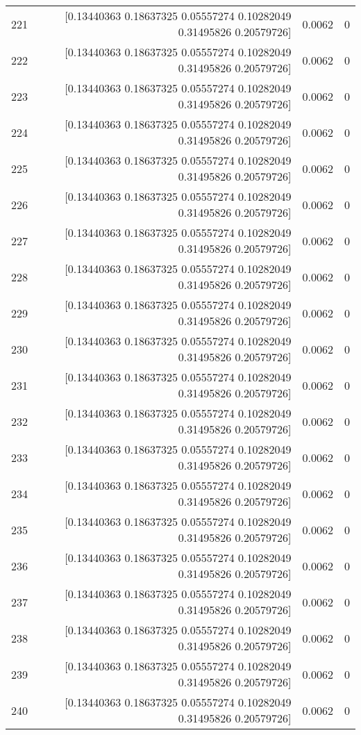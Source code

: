 \begin{longtable}{lrrr}
221 & [0.13440363 0.18637325 0.05557274 0.10282049 0.31495826 0.20579726] & 0.0062 & 0 \\
222 & [0.13440363 0.18637325 0.05557274 0.10282049 0.31495826 0.20579726] & 0.0062 & 0 \\
223 & [0.13440363 0.18637325 0.05557274 0.10282049 0.31495826 0.20579726] & 0.0062 & 0 \\
224 & [0.13440363 0.18637325 0.05557274 0.10282049 0.31495826 0.20579726] & 0.0062 & 0 \\
225 & [0.13440363 0.18637325 0.05557274 0.10282049 0.31495826 0.20579726] & 0.0062 & 0 \\
226 & [0.13440363 0.18637325 0.05557274 0.10282049 0.31495826 0.20579726] & 0.0062 & 0 \\
227 & [0.13440363 0.18637325 0.05557274 0.10282049 0.31495826 0.20579726] & 0.0062 & 0 \\
228 & [0.13440363 0.18637325 0.05557274 0.10282049 0.31495826 0.20579726] & 0.0062 & 0 \\
229 & [0.13440363 0.18637325 0.05557274 0.10282049 0.31495826 0.20579726] & 0.0062 & 0 \\
230 & [0.13440363 0.18637325 0.05557274 0.10282049 0.31495826 0.20579726] & 0.0062 & 0 \\
231 & [0.13440363 0.18637325 0.05557274 0.10282049 0.31495826 0.20579726] & 0.0062 & 0 \\
232 & [0.13440363 0.18637325 0.05557274 0.10282049 0.31495826 0.20579726] & 0.0062 & 0 \\
233 & [0.13440363 0.18637325 0.05557274 0.10282049 0.31495826 0.20579726] & 0.0062 & 0 \\
234 & [0.13440363 0.18637325 0.05557274 0.10282049 0.31495826 0.20579726] & 0.0062 & 0 \\
235 & [0.13440363 0.18637325 0.05557274 0.10282049 0.31495826 0.20579726] & 0.0062 & 0 \\
236 & [0.13440363 0.18637325 0.05557274 0.10282049 0.31495826 0.20579726] & 0.0062 & 0 \\
237 & [0.13440363 0.18637325 0.05557274 0.10282049 0.31495826 0.20579726] & 0.0062 & 0 \\
238 & [0.13440363 0.18637325 0.05557274 0.10282049 0.31495826 0.20579726] & 0.0062 & 0 \\
239 & [0.13440363 0.18637325 0.05557274 0.10282049 0.31495826 0.20579726] & 0.0062 & 0 \\
240 & [0.13440363 0.18637325 0.05557274 0.10282049 0.31495826 0.20579726] & 0.0062 & 0 \\

\end{longtable}
